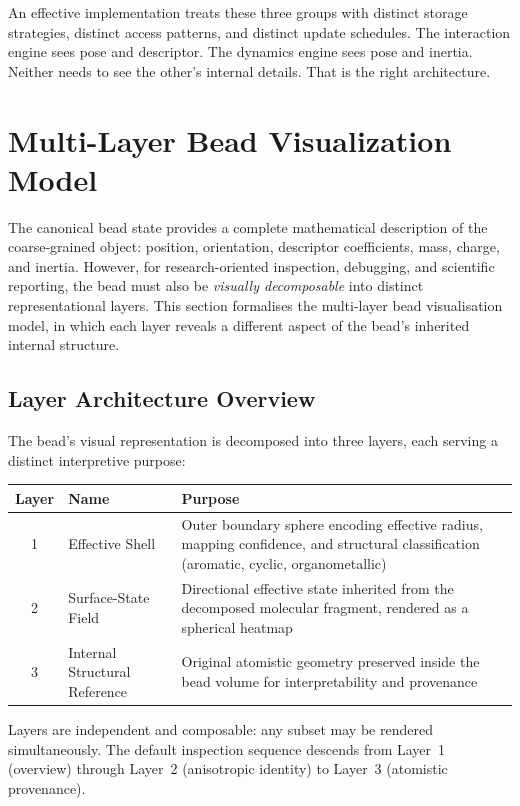 \documentclass[11pt]{article}
\begin{document}
An effective implementation treats these three groups with distinct storage
strategies, distinct access patterns, and distinct update schedules.  The
interaction engine sees pose and descriptor.  The dynamics engine sees pose
and inertia.  Neither needs to see the other's internal details.  That is
the right architecture.

\section{Multi-Layer Bead Visualization Model}

The canonical bead state provides a complete mathematical description of the
coarse-grained object: position, orientation, descriptor coefficients, mass,
charge, and inertia.  However, for research-oriented inspection, debugging,
and scientific reporting, the bead must also be \emph{visually decomposable}
into distinct representational layers.  This section formalises the
multi-layer bead visualisation model, in which each layer reveals a different
aspect of the bead's inherited internal structure.

\subsection{Layer Architecture Overview}

The bead's visual representation is decomposed into three layers, each
serving a distinct interpretive purpose:

\begin{center}
\begin{tabular}{clp{7cm}}
    \textbf{Layer} & \textbf{Name} & \textbf{Purpose} \\
    \hline
    1 & Effective Shell & Outer boundary sphere encoding effective radius,
        mapping confidence, and structural classification (aromatic, cyclic,
        organometallic) \\
    2 & Surface-State Field & Directional effective state inherited from the
        decomposed molecular fragment, rendered as a spherical heatmap \\
    3 & Internal Structural Reference & Original atomistic geometry preserved
        inside the bead volume for interpretability and provenance \\
\end{tabular}
\end{center}

\noindent
Layers are independent and composable: any subset may be rendered
simultaneously.  The default inspection sequence descends from Layer~1
(overview) through Layer~2 (anisotropic identity) to Layer~3 (atomistic
provenance).
\end{document}
